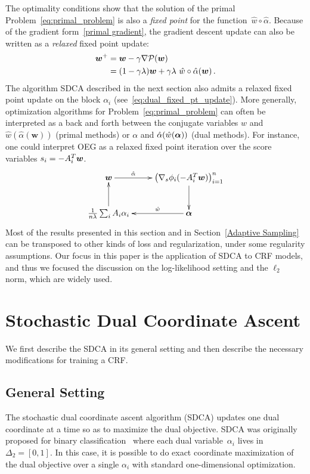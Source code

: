 The optimality conditions show that the solution of the primal Problem~\eqref{eq:primal_problem} is also a \emph{fixed point} for the function~$\hat w \circ \hat \alpha$.
Because of the gradient form~\eqref{primal gradient}, the gradient descent update can also be written as a \emph{relaxed} fixed point update:
\begin{align}
	\boldsymbol{w}^+
	& = \boldsymbol{w} - \gamma \nabla {\mathcal P}(\boldsymbol{w}) \\
	& = (1-\gamma \lambda) \boldsymbol{w}  + \gamma \lambda \,\, \hat w \circ \hat \alpha (\boldsymbol{w}) \, .
\end{align}
The algorithm SDCA described in the next section also admits a relaxed fixed point update on the block $\alpha_i$ (see~\eqref{eq:dual_fixed_pt_update}).
More generally, optimization algorithms for Problem~\eqref{eq:primal_problem} can often be interpreted as a back and forth between the conjugate variables $w$ and $\hat w(\hat \alpha(\bm w))$ (primal methods) or $\alpha$ and $\hat \alpha(\hat w( \boldsymbol{\alpha}))$ (dual methods).
For instance, one could interpret OEG as a relaxed fixed point iteration over the score variables $s_i = -A_i^T\boldsymbol{w}$.
\begin{displaymath}
	\xymatrix{
		\bm w \ar[r]^-{\hat{\alpha}}
		&   \left( \nabla_s \phi_i(-A_i^T \bm w) \right)_{i=1}^n \ar[d] \\
		\frac{1}{n \lambda} \sum_i A_i \alpha_i  \ar[u]
		&  \balpha \ar[l]_-{\hat{w}}
	}
\end{displaymath}
Most of the results presented in this section and in Section~\ref{Adaptive Sampling} can be transposed to other kinds of loss and regularization, under some regularity assumptions.
Our focus in this paper is the application of SDCA to CRF models, and thus we focused the discussion on the log-likelihood setting and the $\ell_2$ norm, which are widely used.


\section{Stochastic Dual Coordinate Ascent} \label{sec:SDCA}

We first describe the SDCA in its general setting and then describe the necessary modifications for training a CRF.

\subsection{General Setting}
The stochastic dual coordinate ascent algorithm (SDCA) updates one dual coordinate at a time so as to maximize the dual objective.
SDCA was originally proposed for binary classification~\citep{shalev-shwartz_stochastic_2013} where each dual variable~$\alpha_i$ lives in $\Delta_2 = [0,1]$.
In this case, it is possible to do exact coordinate maximization of the dual objective over a single $\alpha_i$ with standard one-dimensional optimization.

